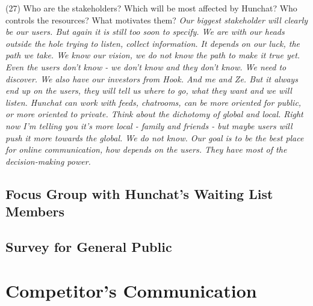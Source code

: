 \documentclass[11pt]{article}
\begin{document}
(27) Who are the stakeholders? Which will be most affected by Hunchat? Who controls the resources? What motivates them? \textit{Our biggest stakeholder will clearly be our users. But again it is still too soon to specify. We are with our heads outside the hole trying to listen, collect information. It depends on our luck, the path we take. We know our vision, we do not know the path to make it true yet. Even the users don't know - we don't know and they don't know. We need to discover. We also have our investors from Hook. And me and Ze. But it always end up on the users, they will tell us where to go, what they want and we will listen. Hunchat can work with feeds, chatrooms, can be more oriented for public, or more oriented to private. Think about the dichotomy of global and local. Right now I'm telling you it's more local - family and friends - but maybe users will push it more towards the global. We do not know. Our goal is to be the best place for online communication, how depends on the users. They have most of the decision-making power.}

\subsection{Focus Group with Hunchat's Waiting List Members} \label{fwl}


\subsection{Survey for General Public}\label{qgp}




\section{Competitor's Communication}\label{comp}
\end{document}
